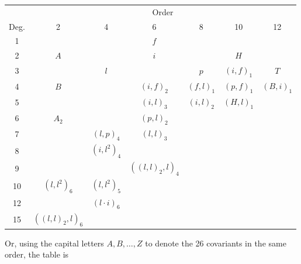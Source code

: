 \documentclass[11pt,a4paper]{article}
\begin{document}
\medskip
\begin{center}
\begin{tabular}{c|cccccc}
            & \multicolumn{6}{c}{Order}\\
Deg. & 2 & 4 & 6 & 8 & 10 & 12 \\
\hline
1   &   &   & $f$            &           &              &     \\
2   & $A$ &   & $i$        &           & $H$          &     \\
3   &   & $l$ &              & $p$       & $(i,f)_{1}$  & $T$ \\
4   & $B$ &   & $(i,f)_{2}$ & $(f,l)_{1}$ & $(p,f)_{1}$ & $(B,i)_{1}$ \\
5   &   &   & $(i,l)_{3}$  & $(i,l)_{2}$ & $(H,l)_{1}$ &     \\
6   & $A_{2}$ &   & $(p,l)_{2}$ &        &              &     \\
7   &   & $(l,p)_{4}$ & $(l,l)_{3}$ &  &              &     \\
8   &   & $(i,l^{2})_{4}$ &       &        &              &     \\
9   &   &   & $((l,l)_{2},l)_{4}$ &   &              &     \\
10  & $(l,l^{2})_{6}$ & $(l,l^{2})_{5}$ &  &        &              &     \\
12  &   & $(l\cdot i)_{6}$ &           &           &              &     \\
15  & $((l,l)_{2},l)_{6}$ &  &      &           &              &     \\
\end{tabular}
\end{center}

\newpage
\noindent
Or, using the capital letters $A,B,\ldots,Z$ to denote the 26
covariants in the same order, the table is
\end{document}

